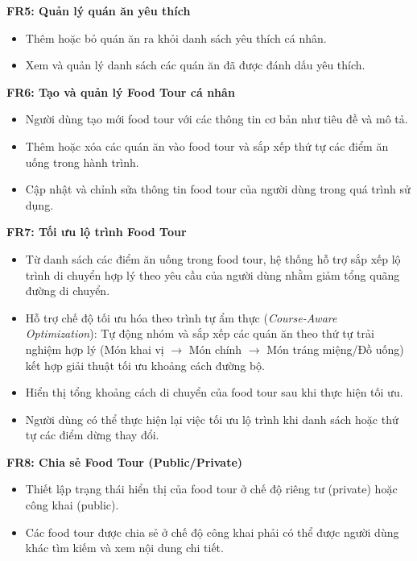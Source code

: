 \textbf{FR5: Quản lý quán ăn yêu thích} 
\begin{itemize}[label=\textbullet]
    \item Thêm hoặc bỏ quán ăn ra khỏi danh sách yêu thích cá
nhân.
    \item Xem và quản lý danh sách các quán ăn đã được đánh dấu yêu thích.
\end{itemize}

\textbf{FR6: Tạo và quản lý Food Tour cá nhân} 
\begin{itemize}[label=\textbullet]
    \item Người dùng tạo mới food tour với các thông tin cơ bản như tiêu đề và
mô tả.
    \item Thêm hoặc xóa các quán ăn vào food tour và sắp xếp thứ tự các điểm ăn uống trong hành trình.
    \item Cập nhật và chỉnh sửa thông tin food tour 
    của người dùng trong quá trình sử dụng.
\end{itemize}

\textbf{FR7: Tối ưu lộ trình Food Tour} 
\begin{itemize}[label=\textbullet]
    \item Từ danh sách các điểm ăn uống trong food tour, hệ thống hỗ trợ sắp xếp lộ trình di chuyển
hợp lý theo yêu cầu của người dùng nhằm giảm tổng quãng đường di chuyển.
    \item Hỗ trợ chế độ tối ưu hóa theo trình tự ẩm thực (\textit{Course-Aware Optimization}): Tự động nhóm và sắp xếp các quán ăn theo thứ tự trải nghiệm hợp lý (Món khai vị $\rightarrow$ Món chính $\rightarrow$ Món tráng miệng/Đồ uống) kết hợp giải thuật tối ưu khoảng cách đường bộ.
    \item Hiển thị tổng khoảng cách di chuyển của food tour sau khi thực hiện tối ưu.
    \item Người dùng có thể thực hiện lại việc tối ưu lộ trình khi danh sách hoặc thứ tự các
điểm dừng thay đổi.
\end{itemize}

\textbf{FR8: Chia sẻ Food Tour (Public/Private)} 
\begin{itemize}[label=\textbullet]
    \item Thiết lập trạng thái hiển thị của food tour ở chế độ riêng
tư (private) hoặc công khai (public).
    \item Các food tour được chia sẻ ở chế độ công khai phải có thể được người dùng khác tìm kiếm và
xem nội dung chi tiết.
\end{itemize}

